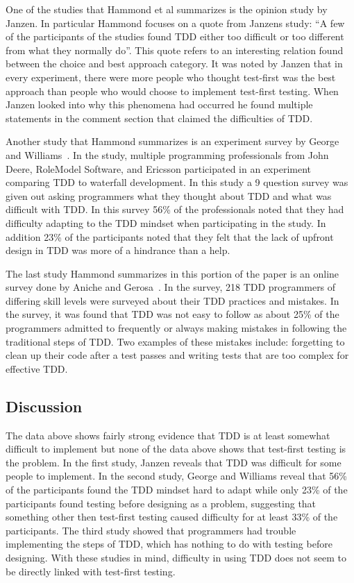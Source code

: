 \documentclass{sig-alternate}
\begin{document}
One of the studies that Hammond et al summarizes is the opinion study by Janzen.  In particular Hammond focuses on a quote from Janzens study: ``A few of the participants of the studies found TDD either too difficult or too different from what they normally do''.  This quote refers to an interesting relation found between the choice and best approach category.  It was noted by Janzen that in every experiment, there were more people who thought test-first was the best approach than people who would choose to implement test-first testing.  When Janzen looked into why this phenomena had occurred he found multiple statements in the comment section that claimed the difficulties of TDD.

Another study that Hammond summarizes is an experiment survey by George and Williams~\cite{George:2003}.  In the study, multiple programming professionals from John Deere, RoleModel Software, and Ericsson participated in an experiment comparing TDD to waterfall development.  In this study a 9 question survey was given out asking programmers what they thought about TDD and what was difficult with TDD.  In this survey 56\% of the professionals noted that they had difficulty adapting to the TDD mindset when participating in the study.  In addition 23\% of the participants noted that they felt that the lack of upfront design in TDD was more of a hindrance than a help. 

The last study Hammond summarizes in this portion of the paper is an online survey done by Aniche and Gerosa~\cite{Aniche:2010}.  In the survey, 218 TDD programmers of differing skill levels were surveyed about their TDD practices and mistakes.  In the survey, it was found that TDD was not easy to follow as about 25\% of the programmers admitted to frequently or always making mistakes in following the traditional steps of TDD.  Two examples of these mistakes include: forgetting to clean up their code after a test passes and writing tests that are too complex for effective TDD.
 
\subsection{Discussion}
The data above shows fairly strong evidence that TDD is at least somewhat difficult to implement but none of the data above shows that test-first testing is the problem.  In the first study, Janzen reveals that TDD was difficult for some people to implement.  In the second study, George and Williams reveal that 56\% of the participants found the TDD mindset hard to adapt while only 23\% of the participants found testing before designing as a problem, suggesting that something other then test-first testing caused difficulty for at least 33\% of the participants.  The third study showed that programmers had trouble implementing the steps of TDD, which has nothing to do with testing before designing.  With these studies in mind, difficulty in using TDD does not seem to be directly linked with test-first testing.
\end{document}
